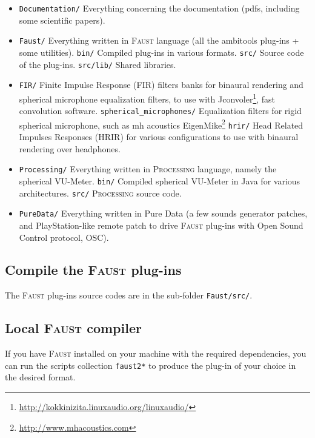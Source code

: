 \documentclass[10pt,a4paper]{article}
\begin{document}
\begin{itemize}
    \item \lstinline'Documentation/' Everything concerning the documentation (pdfs, including some scientific papers).
    \item \lstinline'Faust/' Everything written in \textsc{Faust} language (all the ambitools plug-ins + some utilities).
    	\subitem \lstinline'bin/' Compiled plug-ins in various formats.
    	\subitem \lstinline'src/' Source code of the plug-ins.
    	\subitem \lstinline'src/lib/' Shared libraries.
    \item \lstinline'FIR/' Finite Impulse Response (FIR) filters banks for binaural rendering and spherical microphone equalization filters, to use with Jconvoler\footnote{\url{http://kokkinizita.linuxaudio.org/linuxaudio/}}, fast convolution software.
    	\subitem \lstinline'spherical_microphones/' Equalization filters for rigid spherical microphone, such as mh acoustics EigenMike\textsuperscript{\textregistered}\footnote{\url{http://www.mhacoustics.com}}
  		\subitem \lstinline'hrir/' Head Related Impulses Responses (HRIR) for various configurations to use with binaural rendering over headphones.
    \item \lstinline'Processing/' Everything written in \textsc{Processing} language, namely the spherical VU-Meter.
    	 \subitem \lstinline'bin/' Compiled spherical VU-Meter in Java for various architectures.
    	 \subitem \lstinline'src/' \textsc{Processing} source code.
    \item \lstinline'PureData/' Everything written in Pure Data (a few sounds generator patches, and PlayStation-like remote patch to drive \textsc{Faust} plug-ins with Open Sound Control protocol, OSC).
\end{itemize}

\subsection{Compile the \textsc{Faust} plug-ins}
The \textsc{Faust} plug-ins source codes are in the sub-folder \lstinline'Faust/src/'. 

\subsection{Local \textsc{Faust} compiler}
If you have \textsc{Faust} installed on your machine with the required dependencies, you can run the scripts collection \lstinline'faust2*' to produce the plug-in of your choice in the desired format. 
\end{document}
